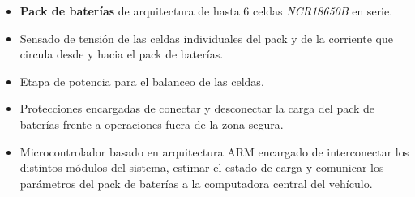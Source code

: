 \documentclass[10pt,a4paper]{article}
\begin{document}
\begin{itemize}
	\item \textbf{Pack de baterías} de arquitectura de hasta 6 celdas \emph{NCR18650B} en serie.
	\item Sensado de tensión de las celdas individuales del pack y de la corriente que circula desde y hacia el pack de baterías.
	\item Etapa de potencia para el balanceo de las celdas.
	\item Protecciones encargadas de conectar y desconectar la carga del pack de baterías frente a operaciones fuera de la zona segura. 
	\item Microcontrolador basado en arquitectura ARM encargado de interconectar los distintos módulos del sistema, estimar el estado de carga y comunicar los parámetros del pack de baterías a la computadora central del vehículo.
\end{itemize}

\clearpage
\end{document}
